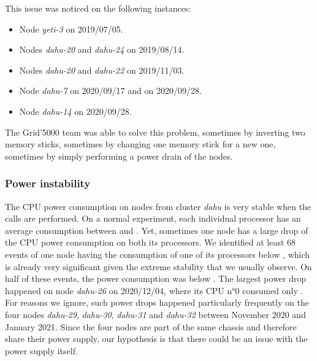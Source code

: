                 This issue was noticed on the following instances:
                \begin{itemize}
                    \item Node \emph{yeti-3} on 2019/07/05.
                    \item Nodes \emph{dahu-20} and \emph{dahu-24} on 2019/08/14.
                    \item Nodes \emph{dahu-20} and \emph{dahu-22} on 2019/11/03.
                    \item Node \emph{dahu-7} on 2020/09/17 and on 2020/09/28.
                    \item Node \emph{dahu-14} on 2020/09/28.
                \end{itemize}

                The Grid'5000 team was able to solve this problem, sometimes by inverting two memory sticks, sometimes
                by changing one memory stick for a new one, sometimes by simply performing a power drain of the nodes.

            \subsubsection{Power instability}%

                The CPU power consumption on nodes from cluster \emph{dahu} is very stable when the \dgemm calls are
                performed. On a normal experiment, each individual processor has an average consumption between
                 and . Yet, sometimes one node has a large drop of the CPU
                power consumption on both its processors. We identified at least 68 events of one node having the
                consumption of one of its processors below , which is already very significant given the
                extreme stability that we usually observe. On half of these events, the power consumption was below
                . The largest power drop happened on node \emph{dahu-26} on 2020/12/04, where its CPU
                n°0 consumed only . For reasons we ignore, such power drops happened particularly
                frequently on the four nodes \emph{dahu-29}, \emph{dahu-30}, \emph{dahu-31} and \emph{dahu-32} between
                November 2020 and January 2021. Since the four nodes are part of the same chassis and therefore share
                their power supply, our hypothesis is that there could be an issue with the power supply itself.

